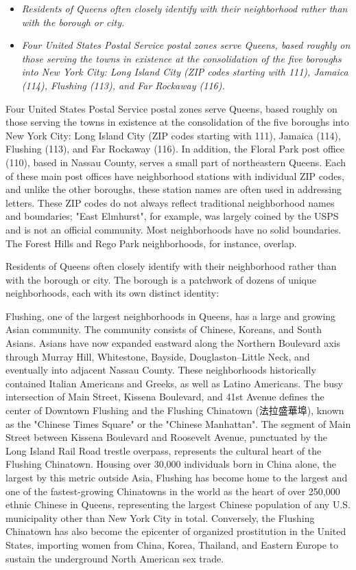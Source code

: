 \begin{itemize}
\item
  \emph{Residents of Queens often closely identify with their
  neighborhood rather than with the borough or city.}
\item
  \emph{Four United States Postal Service postal zones serve Queens,
  based roughly on those serving the towns in existence at the
  consolidation of the five boroughs into New York City: Long Island
  City (ZIP codes starting with 111), Jamaica (114), Flushing (113), and
  Far Rockaway (116).}
\end{itemize}

Four United States Postal Service postal zones serve Queens, based
roughly on those serving the towns in existence at the consolidation of
the five boroughs into New York City: Long Island City (ZIP codes
starting with 111), Jamaica (114), Flushing (113), and Far Rockaway
(116). In addition, the Floral Park post office (110), based in Nassau
County, serves a small part of northeastern Queens. Each of these main
post offices have neighborhood stations with individual ZIP codes, and
unlike the other boroughs, these station names are often used in
addressing letters. These ZIP codes do not always reflect traditional
neighborhood names and boundaries; "East Elmhurst", for example, was
largely coined by the USPS and is not an official community. Most
neighborhoods have no solid boundaries. The Forest Hills and Rego Park
neighborhoods, for instance, overlap.

Residents of Queens often closely identify with their neighborhood
rather than with the borough or city. The borough is a patchwork of
dozens of unique neighborhoods, each with its own distinct identity:

Flushing, one of the largest neighborhoods in Queens, has a large and
growing Asian community. The community consists of Chinese, Koreans, and
South Asians. Asians have now expanded eastward along the Northern
Boulevard axis through Murray Hill, Whitestone, Bayside,
Douglaston--Little Neck, and eventually into adjacent Nassau County.
These neighborhoods historically contained Italian Americans and Greeks,
as well as Latino Americans. The busy intersection of Main Street,
Kissena Boulevard, and 41st Avenue defines the center of Downtown
Flushing and the Flushing Chinatown (法拉盛華埠), known as the "Chinese
Times Square" or the "Chinese Manhattan". The segment of Main Street
between Kissena Boulevard and Roosevelt Avenue, punctuated by the Long
Island Rail Road trestle overpass, represents the cultural heart of the
Flushing Chinatown. Housing over 30,000 individuals born in China alone,
the largest by this metric outside Asia, Flushing has become home to the
largest and one of the fastest-growing Chinatowns in the world as the
heart of over 250,000 ethnic Chinese in Queens, representing the largest
Chinese population of any U.S. municipality other than New York City in
total. Conversely, the Flushing Chinatown has also become the epicenter
of organized prostitution in the United States, importing women from
China, Korea, Thailand, and Eastern Europe to sustain the underground
North American sex trade.

